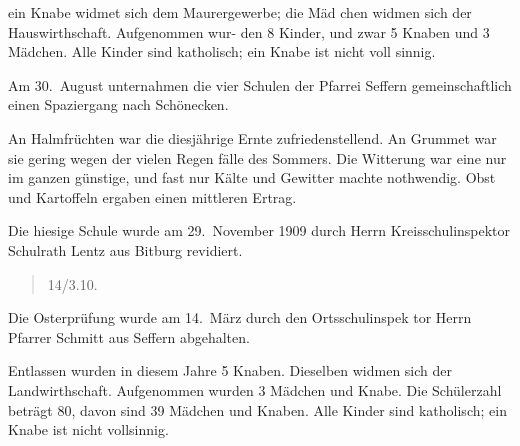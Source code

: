 

ein Knabe widmet sich dem Maurergewerbe; die Mäd\ohb
chen widmen sich der Hauswirthschaft. Aufgenommen wur-
den 8 Kinder, und zwar 5 Knaben und 3 Mädchen.
Alle Kinder sind katholisch; ein Knabe ist nicht voll\ohb
sinnig.

\pend
{}
\pstart

Am 30.\ August unternahmen die vier Schulen der Pfarrei\ob
Seffern gemeinschaftlich einen Spaziergang nach Schönecken.

\pend
{}
\pstart

An Halmfrüchten war die diesjährige Ernte zufriedenstellend.\ob
An Grummet war sie gering wegen der vielen Regen\ohb
fälle des Sommers. Die Witterung war eine nur im\ob
ganzen günstige, und fast nur Kälte und Gewitter machte\unsicher\ob
nothwendig. Obst und Kartoffeln ergaben\ob
einen mittleren Ertrag.

\pend
{}
\pstart


\pend
{}
\pstart

Die hiesige Schule wurde am 29.\ November 1909 durch\ob
Herrn Kreisschulinspektor Schulrath Lentz\unsicher{} aus Bitburg revidiert.

\pend
{}
\pstart


\pend
\begin{verse}
14/3.10.
\end{verse}
\pstart

\pend
{}
\pstart

Die Osterprüfung wurde am 14.\ März durch den Ortsschulinspek\ohb
tor Herrn Pfarrer Schmitt aus Seffern abgehalten.

\pend
{}
\pstart

Entlassen wurden in diesem Jahre 5 Knaben. Dieselben widmen\ob
sich der Landwirthschaft. Aufgenommen wurden 3 Mädchen und Knabe. Die Schülerzahl beträgt 80, davon sind 39 Mädchen und Knaben. Alle Kinder sind katholisch; ein Knabe ist nicht vollsinnig.
\pend

